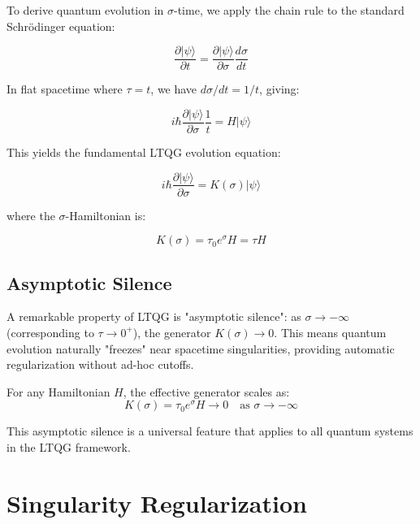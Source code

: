 \documentclass[12pt,a4paper]{article}
\begin{document}
To derive quantum evolution in $\sigma$-time, we apply the chain rule to the standard Schrödinger equation:

\begin{equation}
\frac{\partial |\psi\rangle}{\partial t} = \frac{\partial |\psi\rangle}{\partial \sigma} \frac{d\sigma}{dt}
\end{equation}

In flat spacetime where $\tau = t$, we have $d\sigma/dt = 1/t$, giving:

\begin{equation}
i\hbar \frac{\partial |\psi\rangle}{\partial \sigma} \frac{1}{t} = H |\psi\rangle
\end{equation}

This yields the fundamental LTQG evolution equation:

\begin{equation}
\boxed{i\hbar \frac{\partial |\psi\rangle}{\partial \sigma} = K(\sigma) |\psi\rangle}
\label{eq:ltqg_schrodinger}
\end{equation}

where the $\sigma$-Hamiltonian is:

\begin{equation}
\boxed{K(\sigma) = \tau_0 e^{\sigma} H = \tau H}
\label{eq:sigma_hamiltonian}
\end{equation}

\subsection{Asymptotic Silence}

A remarkable property of LTQG is "asymptotic silence": as $\sigma \to -\infty$ (corresponding to $\tau \to 0^+$), the generator $K(\sigma) \to 0$. This means quantum evolution naturally "freezes" near spacetime singularities, providing automatic regularization without ad-hoc cutoffs.

For any Hamiltonian $H$, the effective generator scales as:
\begin{equation}
K(\sigma) = \tau_0 e^{\sigma} H \to 0 \quad \text{as } \sigma \to -\infty
\label{eq:asymptotic_silence}
\end{equation}

This asymptotic silence is a universal feature that applies to all quantum systems in the LTQG framework.

\section{Singularity Regularization}
\end{document}
